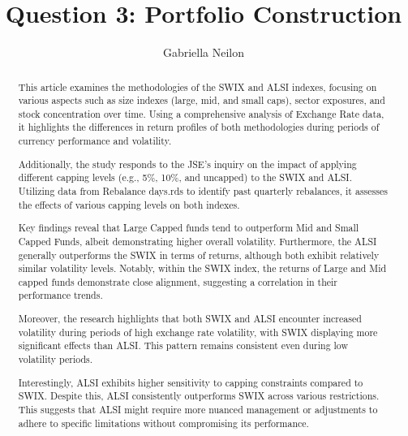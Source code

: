 \documentclass[11pt,preprint, authoryear]{elsarticle}
\numberwithin{equation}{section}
\numberwithin{figure}{section}
\numberwithin{table}{section}
\begin{document}
\begin{frontmatter}  %

\title{Question 3: Portfolio Construction}





\author[Add1]{Gabriella Neilon}





\address[Add1]{Stellenbosch University}


\begin{abstract}
\small{
This article examines the methodologies of the SWIX and ALSI indexes,
focusing on various aspects such as size indexes (large, mid, and small
caps), sector exposures, and stock concentration over time. Using a
comprehensive analysis of Exchange Rate data, it highlights the
differences in return profiles of both methodologies during periods of
currency performance and volatility.

Additionally, the study responds to the JSE's inquiry on the impact of
applying different capping levels (e.g., 5\%, 10\%, and uncapped) to the
SWIX and ALSI. Utilizing data from Rebalance days.rds to identify past
quarterly rebalances, it assesses the effects of various capping levels
on both indexes.

Key findings reveal that Large Capped funds tend to outperform Mid and
Small Capped Funds, albeit demonstrating higher overall volatility.
Furthermore, the ALSI generally outperforms the SWIX in terms of
returns, although both exhibit relatively similar volatility levels.
Notably, within the SWIX index, the returns of Large and Mid capped
funds demonstrate close alignment, suggesting a correlation in their
performance trends.

Moreover, the research highlights that both SWIX and ALSI encounter
increased volatility during periods of high exchange rate volatility,
with SWIX displaying more significant effects than ALSI. This pattern
remains consistent even during low volatility periods.

Interestingly, ALSI exhibits higher sensitivity to capping constraints
compared to SWIX. Despite this, ALSI consistently outperforms SWIX
across various restrictions. This suggests that ALSI might require more
nuanced management or adjustments to adhere to specific limitations
without compromising its performance.
}
\end{abstract}

\vspace{1cm}





\vspace{0.5cm}

\end{frontmatter}
\end{document}
